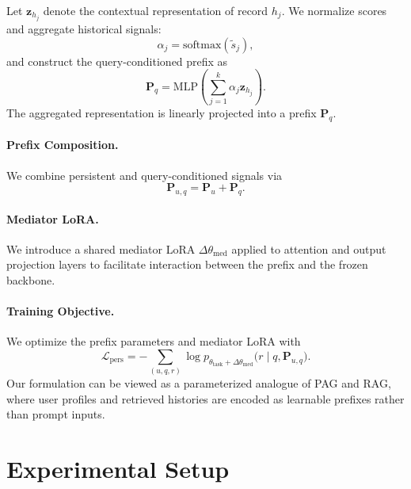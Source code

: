 \documentclass[11pt]{article}
\begin{document}
Let $\mathbf{z}_{h_j}$ denote the contextual representation of record $h_j$. We normalize scores and aggregate historical signals:
\begin{equation}
\alpha_j = \mathrm{softmax}(\tilde{s}_j),
\end{equation}
and construct the query-conditioned prefix as
\begin{equation}
\mathbf{P}_q = \mathrm{MLP}\!\left(\sum_{j=1}^{k} \alpha_j \mathbf{z}_{h_j}\right).
\end{equation}
The aggregated representation is linearly projected into a prefix $\mathbf{P}_q$.

\paragraph{Prefix Composition.}
We combine persistent and query-conditioned signals via
\begin{equation}
\mathbf{P}_{u,q} = \mathbf{P}_u + \mathbf{P}_q.
\end{equation}

\paragraph{Mediator LoRA.}
We introduce a shared mediator LoRA $\Delta\theta_{\text{med}}$ applied to attention and output projection layers to facilitate interaction between the prefix and the frozen backbone.

\paragraph{Training Objective.}
We optimize the prefix parameters and mediator LoRA with
\begin{equation}
\mathcal{L}_{\text{pers}}
=
-\sum_{(u,q,r)}
\log p_{\theta_{\text{task}}+\Delta\theta_{\text{med}}}
\bigl(
r \mid q, \mathbf{P}_{u,q}
\bigr).
\end{equation}
Our formulation can be viewed as a parameterized analogue of PAG and RAG, where user profiles and retrieved histories are encoded as learnable prefixes rather than prompt inputs.




\section{Experimental Setup}
\end{document}
